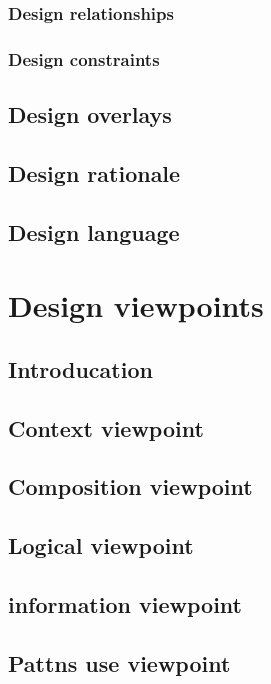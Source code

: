 \documentclass{scrreprt}
\begin{document}
\subsection{Design relationships}

\subsection{Design constraints}

\section{Design overlays}

\section{Design rationale}

\section{Design language}

\chapter{Design viewpoints}

\section{Introducation}

\section{Context viewpoint}

\section{Composition viewpoint}

\section{Logical viewpoint}

\section{information viewpoint}

\section{Pattns use viewpoint}
\end{document}
